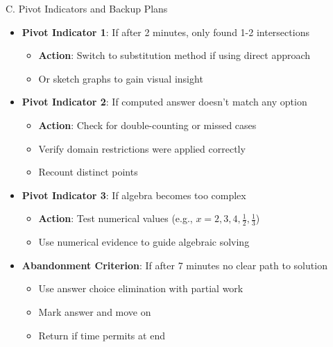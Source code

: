 \documentclass[12pt]{article}
\begin{document}
\begin{roadmapbox}{C. Pivot Indicators and Backup Plans}
\begin{itemize}[leftmargin=*]
    \item \textbf{Pivot Indicator 1}: If after 2 minutes, only found 1-2 intersections
    \begin{itemize}
        \item \textbf{Action}: Switch to substitution method if using direct approach
        \item Or sketch graphs to gain visual insight
    \end{itemize}
    
    \item \textbf{Pivot Indicator 2}: If computed answer doesn't match any option
    \begin{itemize}
        \item \textbf{Action}: Check for double-counting or missed cases
        \item Verify domain restrictions were applied correctly
        \item Recount distinct points
    \end{itemize}
    
    \item \textbf{Pivot Indicator 3}: If algebra becomes too complex
    \begin{itemize}
        \item \textbf{Action}: Test numerical values (e.g., $x = 2, 3, 4, \frac{1}{2}, \frac{1}{3}$)
        \item Use numerical evidence to guide algebraic solving
    \end{itemize}
    
    \item \textbf{Abandonment Criterion}: If after 7 minutes no clear path to solution
    \begin{itemize}
        \item Use answer choice elimination with partial work
        \item Mark answer and move on
        \item Return if time permits at end
    \end{itemize}
\end{itemize}
\end{roadmapbox}
\end{document}
